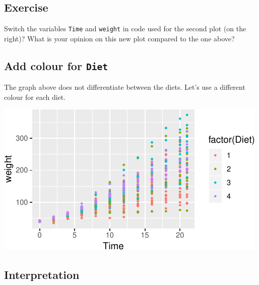 \documentclass[a4paper,9pt,twocolumn,twoside,printwatermark=false]{pinp}
\begin{document}
\subsection{Exercise}\label{exercise-3}

Switch the variables \texttt{Time} and \texttt{weight} in code used for
the second plot (on the right)? What is your opinion on this new plot
compared to the one above?

\subsection{\texorpdfstring{Add colour for
\texttt{Diet}}{Add colour for Diet}}\label{add-colour-for-diet}

The graph above does not differentiate between the diets. Let's use a
different colour for each diet.

\begin{Shaded}
\begin{Highlighting}[]
\OperatorTok{+}
\StringTok{  }\NormalTok{() }
\end{Highlighting}
\end{Shaded}

\begin{center}\includegraphics{Getting-Started-in-R_files/figure-latex/addColourPlot-1} \end{center}

\subsection{Interpretation}\label{interpretation-1}
\end{document}
